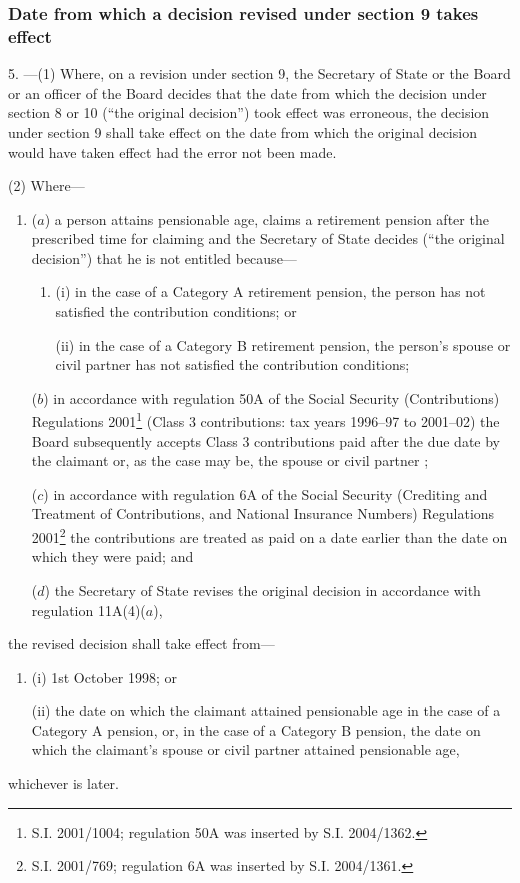 \documentclass[12pt,a4paper]{article}
\begin{document}
\subsubsection[5. Date from which a decision revised under section 9 takes effect]{Date from which a decision revised under section 9 takes effect}

5.%
---(1)  %
  Where, on a revision under section 9, the Secretary of State
or the Board or an officer of the Board  %
decides that the date from which the decision under section 8 or 10 (“the original decision”) took effect was erroneous, the decision under section 9 shall take effect on the date from which the original decision would have taken effect had the error not been made.

(2) Where—
\begin{enumerate}\item[]
($a$) a person attains pensionable age, claims a retirement pension after the prescribed time for claiming and the Secretary of State decides (“the original decision”) that he is not entitled because—
\begin{enumerate}\item[]
(i) in the case of a Category A retirement pension, the person has not satisfied the contribution conditions; or

(ii) in the case of a Category B retirement pension, the person’s spouse 
or civil partner  %
has not satisfied the contribution conditions;
\end{enumerate}

($b$) in accordance with regulation 50A of the Social Security (Contributions) Regulations 2001\footnote{S.I. 2001/1004; regulation 50A was inserted by S.I. 2004/1362.} (Class 3 contributions: tax years 1996--97 to 2001--02) the Board subsequently accepts Class 3 contributions paid after the due date by the claimant or, as the case may be, the spouse
or civil partner%
;

($c$) in accordance with regulation 6A of the Social Security (Crediting and Treatment of Contributions, and National Insurance Numbers) Regulations 2001\footnote{S.I. 2001/769; regulation 6A was inserted by S.I. 2004/1361.} the contributions are treated as paid on a date earlier than the date on which they were paid; and

($d$) the Secretary of State revises the original decision in accordance with regulation 11A(4)($a$),
\end{enumerate}
the revised decision shall take effect from—
\begin{enumerate}\item[]
(i) 1st October 1998; or

(ii) the date on which the claimant attained pensionable age in the case of a Category A pension, or, in the case of a Category B pension, the date on which the claimant’s spouse or civil partner  %
attained pensionable age,
\end{enumerate}
whichever is later.
\end{document}
